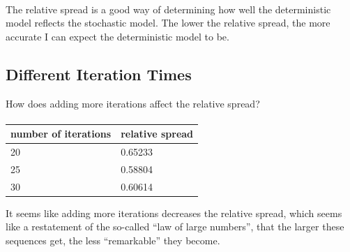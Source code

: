 \documentclass{article}
\begin{document}
\paragraph{}
The relative spread is a good way of determining how well the deterministic
	model reflects the stochastic model.
The lower the relative spread, the more accurate I can expect the deterministic model
	to be.

\subsection{Different Iteration Times}

How does adding more iterations affect the relative spread?

\paragraph{}
\begin{tabular}{|l|l|}
\hline
number of iterations & relative spread \\
\hline
20 & 0.65233 \\
\hline
25 & 0.58804 \\
\hline
30 & 0.60614 \\
\hline
\end{tabular}

It seems like adding more iterations decreases the relative spread,
	which seems like a restatement of the so-called ``law of large numbers'', 
	that the larger these sequences get, the less ``remarkable'' they 
	become.
\end{document}
